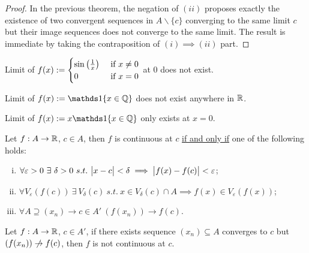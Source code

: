 \documentclass[11pt]{article}
\begin{document}
	\begin{proof}
		In the previous theorem, the negation of $(ii)$ proposes exactly the existence of two convergent sequences in $A \backslash \{c\}$ converging to the same limit $c$ but their image sequences does not converge to the same limit. The result is immediate by taking the contraposition of $(i) \implies (ii)$ part.
	\end{proof}
	
	\begin{example}
		Limit of $f(x) := \begin{cases}
			\sin\left(\frac{1}{x}\right) &\text{{ if }} x \neq 0 \\
			0 &\text{{ if }} x = 0
		\end{cases}$ at 0 does not exist.
	\end{example}
	
	\begin{example}
		Limit of $f(x) := \id{x \in \Q}$ does not exist anywhere in $\mathbb{R}$.
	\end{example}
	
	\begin{example}
		Limit of $f(x) := x \id{x \in \Q}$ only exists at $x = 0$.
	\end{example}
	
	\begin{theorem}
		Let $f: A \to \mathbb{R}$, $c \in A$, then $f$ is continuous at $c$ \ul{if and only if} one of the following holds:
		\begin{enumerate}[(i)]
			\item $\forall \varepsilon > 0\ \exists\ \delta > 0\ s.t.\ \abs{x - c} < \delta \implies \abs{f(x) - f(c)} < \varepsilon$;
			\item $\forall V_\varepsilon(f(c))\ \exists\  V_\delta(c)\ s.t.\ x \in V_\delta (c) \cap A \implies f(x) \in V_\varepsilon (f(x))$;
			\item $\forall A \supseteq (x_n) \to c \in A'\ (f(x_n)) \to f(c)$.
		\end{enumerate}
	\end{theorem}
	
	\begin{proposition}
		Let $f: A \to \mathbb{R}$, $c \in A'$, if there exists sequence $(x_n) \subseteq A$ converges to $c$ but $(f(x_n)) \centernot \to f(c)$, then $f$ is not continuous at $c$.
	\end{proposition}
	
\end{document}
